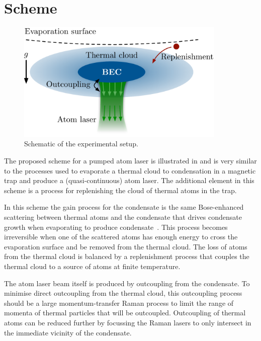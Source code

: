 \section{Scheme}
\label{KineticTheory:Scheme}

\begin{figure}
    \centering
        \includegraphics[width=10cm]{QKTScheme}
    \caption{Schematic of the experimental setup.}
    \label{KineticTheory:QKTScheme}
\end{figure}

The proposed scheme for a pumped atom laser is illustrated in  and is very similar to the processes used to evaporate a thermal cloud to condensation in a magnetic trap and produce a (quasi-continuous) atom laser. The additional element in this scheme is a process for replenishing the cloud of thermal atoms in the trap.  

In this scheme the gain process for the condensate is the same Bose-enhanced scattering between thermal atoms and the condensate that drives condensate growth when evaporating to produce condensate~\citep{Gardiner:1997kx,Davis:2000vn,Bijlsma:2000}.  This process becomes irreversible when one of the scattered atoms has enough energy to cross the evaporation surface and be removed from the thermal cloud.  The loss of atoms from the thermal cloud is balanced by a replenishment process that couples the thermal cloud to a source of atoms at finite temperature.

The atom laser beam itself is produced by outcoupling from the condensate.  To minimise direct outcoupling from the thermal cloud, this outcoupling process should be a large momentum-transfer Raman process to limit the range of momenta of thermal particles that will be outcoupled.  Outcoupling of thermal atoms can be reduced further by focussing the Raman lasers to only intersect in the immediate vicinity of the condensate.

